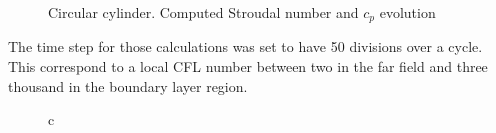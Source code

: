 \begin{figure}
\begin{center}
\begin{tabular}{c}
  \end{tabular}
 \end{center}
 \vspace{-5mm}
 \caption{Circular cylinder. Computed Stroudal number and $c_p$ evolution}
 \label{stroudal.fig}
\end{figure}
%

 The time step for those calculations was set to have 50 divisions over a cycle.
 This correspond to a local CFL number between two in the far field and three
 thousand in the boundary layer region.
%
\begin{figure}[ht]
 \begin{center}
  \begin{tabular}{c}
\end{tabular}
\end{center}
\end{figure}
